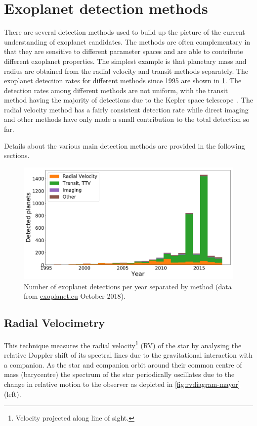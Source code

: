 
\section{Exoplanet detection methods}
\label{sec:detection_methods}
There are several detection methods used to build up the picture of the current understanding of exoplanet candidates.
The methods are often complementary in that they are sensitive to different parameter spaces and are able to contribute different exoplanet properties.
The simplest example is that planetary mass and radius are obtained from the radial velocity and transit methods separately.
The exoplanet detection rates for different methods since 1995 are shown in \cref{fig:detection_year_method}.
The detection rates among different methods are not uniform, with the transit method having the majority of detections due to the Kepler space telescope~\citep{borucki_finding_2008}.
The radial velocity method has a fairly consistent detection rate while direct imaging and other methods have only made a small contribution to the total detection so far.

Details about the various main detection methods are provided in the following sections.

\begin{figure}
    \centering
    \includegraphics[width=0.7\linewidth]{./figures/introduction/exoplanetEU_year_method.pdf}
    \caption{Number of exoplanet detections per year separated by method (data from \href{http://ww.exoplanet.eu}{exoplanet.eu} October 2018).}
    \label{fig:detection_year_method}
\end{figure}

\subsection{Radial Velocimetry}
\label{subsec:radial_velocimetry}
This technique measures the radial velocity\footnote{Velocity projected along line of sight.} (RV) of the star by analysing the relative Doppler shift of its spectral lines due to the gravitational interaction with a companion.
As the star and companion orbit around their common centre of mass (barycentre) the spectrum of the star periodically oscillates due to the change in relative motion to the observer as depicted in \cref{fig:rvdiagram-mayor} (left).

